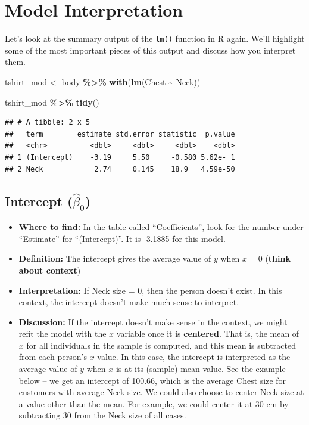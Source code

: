 \documentclass[
]{book}
\newenvironment{Shaded}{\begin{snugshade}}{\end{snugshade}}
\newcommand{\FunctionTok}[1]{\textcolor[rgb]{0.13,0.29,0.53}{\textbf{#1}}}
\newcommand{\NormalTok}[1]{#1}
\newcommand{\OtherTok}[1]{\textcolor[rgb]{0.56,0.35,0.01}{#1}}
\newcommand{\SpecialCharTok}[1]{\textcolor[rgb]{0.81,0.36,0.00}{\textbf{#1}}}
\providecommand{\tightlist}{%
  \setlength{\itemsep}{0pt}\setlength{\parskip}{0pt}}
\begin{document}
\section{Model Interpretation}\label{model-interpretation}

Let's look at the summary output of the \texttt{lm()} function in R again. We'll highlight some of the most important pieces of this output and discuss how you interpret them.

\begin{Shaded}
\begin{Highlighting}[]
\NormalTok{tshirt\_mod }\OtherTok{\textless{}{-}}\NormalTok{ body }\SpecialCharTok{\%\textgreater{}\%}
  \FunctionTok{with}\NormalTok{(}\FunctionTok{lm}\NormalTok{(Chest }\SpecialCharTok{\textasciitilde{}}\NormalTok{ Neck))}

\NormalTok{tshirt\_mod }\SpecialCharTok{\%\textgreater{}\%}
  \FunctionTok{tidy}\NormalTok{()}
\end{Highlighting}
\end{Shaded}

\begin{verbatim}
## # A tibble: 2 x 5
##   term        estimate std.error statistic  p.value
##   <chr>          <dbl>     <dbl>     <dbl>    <dbl>
## 1 (Intercept)    -3.19     5.50     -0.580 5.62e- 1
## 2 Neck            2.74     0.145    18.9   4.59e-50
\end{verbatim}

\subsection{\texorpdfstring{Intercept (\(\hat{\beta}_0\))}{Intercept (\textbackslash hat\{\textbackslash beta\}\_0)}}\label{intercept-hatbeta_0}

\begin{itemize}
\tightlist
\item
  \textbf{Where to find:} In the table called ``Coefficients'', look for the number under ``Estimate'' for ``(Intercept)''. It is -3.1885 for this model.
\item
  \textbf{Definition:} The intercept gives the average value of \(y\) when \(x=0\) (\textbf{think about context})
\item
  \textbf{Interpretation:} If Neck size = 0, then the person doesn't exist. In this context, the intercept doesn't make much sense to interpret.
\item
  \textbf{Discussion:} If the intercept doesn't make sense in the context, we might refit the model with the \(x\) variable once it is \textbf{centered}. That is, the mean of \(x\) for all individuals in the sample is computed, and this mean is subtracted from each person's \(x\) value. In this case, the intercept is interpreted as the average value of \(y\) when \(x\) is at its (sample) mean value. See the example below -- we get an intercept of 100.66, which is the average Chest size for customers with average Neck size. We could also choose to center Neck size at a value other than the mean. For example, we could center it at 30 cm by subtracting 30 from the Neck size of all cases.
\end{itemize}
\end{document}
